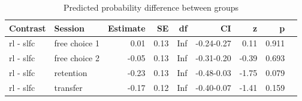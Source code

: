 \documentclass[pdflatex,sn-nature]{sn-jnl}%
\theoremstyle{thmstyleone}%
\theoremstyle{thmstyletwo}%
\theoremstyle{thmstylethree}%
\begin{document}
\begin{appendices}
\begin{table}[p]
\caption{Predicted probability difference between groups}\label{strategychoice_theorybest_groupdiff}
\begin{tabular}{llrrrrrrl}
  \hline
 Contrast & Session & Estimate & SE & df & CI & z & p \\ 
  \hline
rl - slfc & free choice 1 & 0.01 & 0.13 & Inf & -0.24-0.27 & 0.11 &  0.911 \\ 
rl - slfc & free choice 2 & -0.05 & 0.13 & Inf & -0.31-0.20 & -0.39 &   0.693 \\ 
rl - slfc & retention & -0.23 & 0.13 & Inf & -0.48-0.03 & -1.75 &  0.079 \\ 
rl - slfc & transfer & -0.17 & 0.12 & Inf & -0.40-0.07 & -1.41 &  0.159 \\ 
   \hline
\end{tabular}
\end{table}





\end{appendices}
\end{document}
